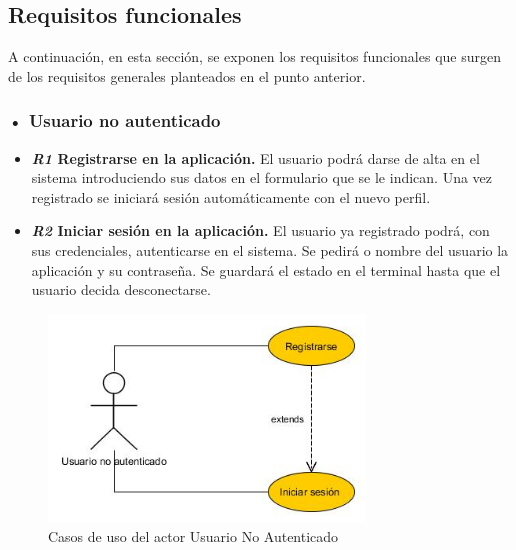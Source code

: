 \subsection{Requisitos funcionales}
A continuación, en esta sección, se exponen los requisitos funcionales que surgen de los requisitos generales planteados en el punto anterior.
\subsubsection{• Usuario no autenticado}
\begin{itemize}
\item\textbf{ \textit{R1}  Registrarse en la aplicación.}
 El usuario podrá darse de alta en el sistema
introduciendo sus datos en el formulario que se le indican. Una vez registrado se iniciará sesión
automáticamente con el nuevo perfil.

\item \textbf{\textit{R2} Iniciar sesión en la aplicación. }
El usuario ya registrado podrá, con
sus credenciales, autenticarse en el  sistema. Se pedirá o nombre del usuario la aplicación y  su contraseña. Se guardará el estado en el terminal hasta que el usuario decida desconectarse.
\end{itemize} 
\begin{figure}[H]
		\centering
		\includegraphics[width=0.75\textwidth] {usuario-no-autenticado.jpg}
		\caption{Casos de uso del actor Usuario No Autenticado }
	\end{figure}
